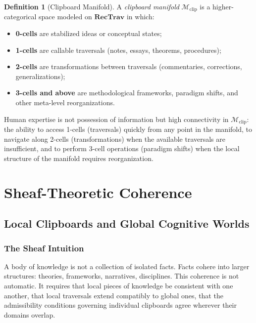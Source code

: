 \documentclass[12pt,oneside]{book}
\theoremstyle{plain}
\theoremstyle{definition}
\newtheorem{definition}[theorem]{Definition}
\theoremstyle{plain}
\newcommand{\RecTrav}{\mathbf{RecTrav}}
\newcommand{\cM}{\mathcal{M}}
\begin{document}
\begin{definition}[Clipboard Manifold]
A \emph{clipboard manifold} $\cM_{\text{clip}}$ is a higher-categorical space modeled on $\RecTrav$ in which:
\begin{itemize}[noitemsep]
\item \textbf{0-cells} are stabilized ideas or conceptual states;
\item \textbf{1-cells} are callable traversals (notes, essays, theorems, procedures);
\item \textbf{2-cells} are transformations between traversals (commentaries, corrections, generalizations);
\item \textbf{3-cells and above} are methodological frameworks, paradigm shifts, and other meta-level reorganizations.
\end{itemize}
\end{definition}

Human expertise is not possession of information but high connectivity in $\cM_{\text{clip}}$: the ability to access 1-cells (traversals) quickly from any point in the manifold, to navigate along 2-cells (transformations) when the available traversals are insufficient, and to perform 3-cell operations (paradigm shifts) when the local structure of the manifold requires reorganization.

\part{Sheaf-Theoretic Coherence}

\chapter{Local Clipboards and Global Cognitive Worlds}
\label{ch:sheaves}

\section{The Sheaf Intuition}

A body of knowledge is not a collection of isolated facts. Facts cohere into larger structures: theories, frameworks, narratives, disciplines. This coherence is not automatic. It requires that local pieces of knowledge be consistent with one another, that local traversals extend compatibly to global ones, that the admissibility conditions governing individual clipboards agree wherever their domains overlap.
\end{document}
